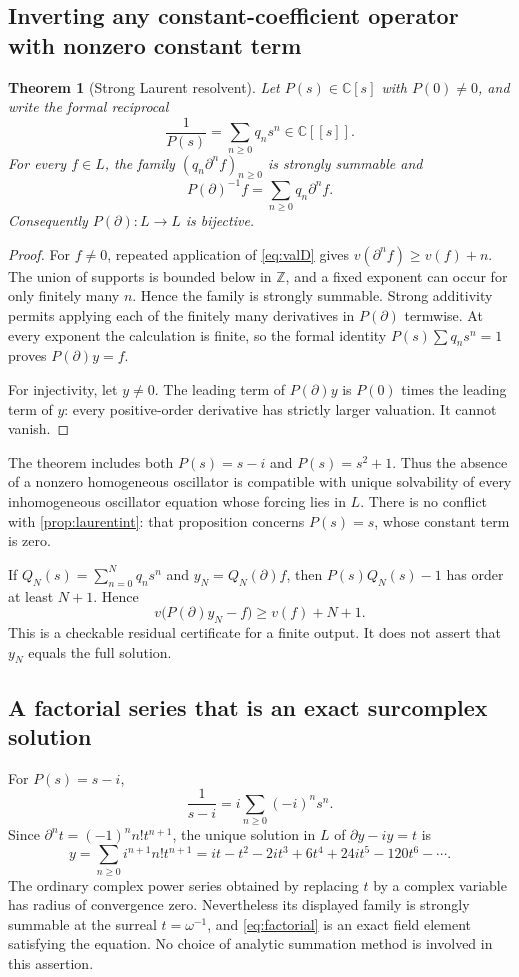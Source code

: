 \documentclass[11pt,letterpaper]{article}
\numberwithin{equation}{section}
\newtheorem{theorem}{Theorem}[section]
\theoremstyle{definition}
\theoremstyle{remark}
\newcommand{\C}{\mathbb C}
\newcommand{\Z}{\mathbb Z}
\newcommand{\D}{\partial}
\begin{document}
\subsection{Inverting any constant-coefficient operator with nonzero constant term}
\begin{theorem}[Strong Laurent resolvent]\label{thm:resolvent}
Let $P(s)\in\C[s]$ with $P(0)\ne0$, and write the formal reciprocal
\[
 \frac1{P(s)}=\sum_{n\ge0}q_ns^n\in\C[[s]].
\]
For every $f\in L$, the family $(q_n\D^n f)_{n\ge0}$ is strongly summable
and
\begin{equation}\label{eq:resolvent}
 P(\D)^{-1}f=\sum_{n\ge0}q_n\D^nf.
\end{equation}
Consequently $P(\D):L\to L$ is bijective.
\end{theorem}
\begin{proof}
For $f\ne0$, repeated application of \eqref{eq:valD} gives
$v(\D^nf)\ge v(f)+n$. The union of supports is bounded below in $\Z$,
and a fixed exponent can occur for only finitely many $n$. Hence the family
is strongly summable. Strong additivity permits applying each of the
finitely many derivatives in $P(\D)$ termwise. At every exponent the
calculation is finite, so the formal identity $P(s)\sum q_ns^n=1$ proves
$P(\D)y=f$.

For injectivity, let $y\ne0$. The leading term of $P(\D)y$ is $P(0)$
times the leading term of $y$: every positive-order derivative has strictly
larger valuation. It cannot vanish.
\end{proof}

The theorem includes both $P(s)=s-i$ and $P(s)=s^2+1$. Thus the absence of a
nonzero homogeneous oscillator is compatible with unique solvability of
every inhomogeneous oscillator equation whose forcing lies in $L$.
There is no conflict with \cref{prop:laurentint}: that proposition concerns
$P(s)=s$, whose constant term is zero.

If $Q_N(s)=\sum_{n=0}^Nq_ns^n$ and $y_N=Q_N(\D)f$, then
$P(s)Q_N(s)-1$ has order at least $N+1$. Hence
\begin{equation}\label{eq:residual}
 v\bigl(P(\D)y_N-f\bigr)\ge v(f)+N+1.
\end{equation}
This is a checkable residual certificate for a finite output. It does not
assert that $y_N$ equals the full solution.

\subsection{A factorial series that is an exact surcomplex solution}
For $P(s)=s-i$,
\[
 \frac1{s-i}=i\sum_{n\ge0}(-i)^ns^n.
\]
Since $\D^nt=(-1)^nn!t^{n+1}$, the unique solution in $L$ of
$\D y-iy=t$ is
\begin{equation}\label{eq:factorial}
 y=\sum_{n\ge0}i^{n+1}n!t^{n+1}
   =it-t^2-2it^3+6t^4+24it^5-120t^6-\cdots.
\end{equation}
The ordinary complex power series obtained by replacing $t$ by a complex
variable has radius of convergence zero. Nevertheless its displayed family
is strongly summable at the surreal $t=\omega^{-1}$, and
\eqref{eq:factorial} is an exact field element satisfying the equation.
No choice of analytic summation method is involved in this assertion.
\end{document}
